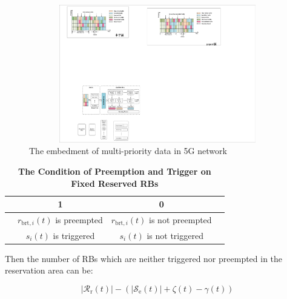 \documentclass{SCIS2021}
\begin{document}
	\begin{figure}[t] 
		\flushright
		\includegraphics[height=6cm, width=14cm]{RB} 
		\caption{The embedment of multi-priority data in 5G network} 
		\label{fig:RBs}
	\end{figure}
	
	
	\begin{table}[h]
		\caption{\textbf{The Condition of Preemption and Trigger on Fixed Reserved RBs\label{key}}}
		\label{tal:preemption}
		\label{tab1}
		\tabcolsep 40pt %
		\begin{tabular*}{\textwidth}{cccc}
			\toprule
			\bm{$\gamma_{i}=\zeta_{i} \varphi_{i}$} & \textbf{1} & \textbf{0}  \\\hline
			\bm{$\zeta_{i}$} & $r_{\text{brt},i}(t)$ is preempted & $r_{\text{brt},i}(t)$ is not preempted \\
			\bm{$\varphi_{i}$} & $s_{i}(t)$ is triggered & $s_{i}(t)$ is not triggered \\
			\bottomrule
		\end{tabular*}
	\end{table}
	
	
	\par Then the number of RBs which are neither triggered nor preempted in the reservation area can be:
	
	\setlength\abovedisplayskip{-13pt}
	\begin{center}
		\begin{equation}
			\left|\mathcal{R}_\mathrm{r}(t)\right|-\left(\left|\mathcal{S}_{\mathrm{e}}(t)\right|+\zeta(t)-\gamma(t)\right)
		\end{equation}
	\end{center}
	\setlength\belowdisplayskip{-8pt}
	
\end{document}
